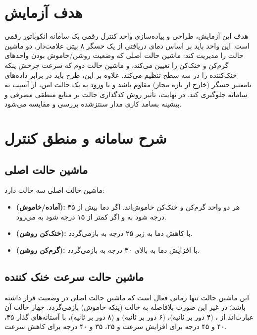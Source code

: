 \documentclass[11pt,a4paper]{article}
\begin{document}
\section{هدف آزمایش}
هدف این آزمایش، طراحی و پیاده‌سازی واحد کنترل رقمی  یک سامانه انکوباتور رقمی  است. این واحد باید بر اساس دمای دریافتی از یک حسگر ۸ بیتی علامت‌دار، دو ماشین حالت را مدیریت کند: ماشین حالت اصلی که وضعیت روشن/خاموش بودن واحدهای گرم‌کن و خنک‌کن را تعیین می‌کند، و ماشین حالت دوم که سرعت چرخش پنکه خنک‌کننده را در سه سطح تنظیم می‌کند. علاوه بر این، طرح باید در برابر داده‌های نامعتبر حسگر (خارج از بازه مجاز) مقاوم باشد و با ورود به یک حالت امن، از آسیب به سامانه جلوگیری کند. در نهایت، تأثیر روش کدگذاری حالت  بر منابع منطقی مصرفی و بیشینه بسامد کاری مدار سنتزشده بررسی و مقایسه می‌شود.

\section{شرح سامانه و منطق کنترل}

\subsection{ماشین حالت اصلی}
ماشین حالت اصلی سه حالت دارد:
\begin{itemize}
    \item \textbf{ (آماده/خاموش):} هر دو واحد گرم‌کن و خنک‌کن خاموش‌اند. اگر دما بیش از ۳۵ درجه شود به  و اگر کمتر از ۱۵ درجه شود به  می‌رود.
    \item \textbf{ (خنک‌کن روشن):} با کاهش دما به زیر ۲۵ درجه به  بازمی‌گردد.
    \item \textbf{ (گرم‌کن روشن):} با افزایش دما به بالای ۳۰ درجه به  بازمی‌گردد.
\end{itemize}

\subsection{ماشین حالت سرعت خنک کننده}
این ماشین حالت تنها زمانی فعال است که ماشین حالت اصلی در وضعیت  قرار داشته باشد؛ در غیر این صورت بلافاصله به حالت  (پنکه خاموش) بازمی‌گردد. چهار حالت آن عبارت‌اند از ،  (۴ دور بر ثانیه)،  (۶ دور بر ثانیه) و  (۸ دور بر ثانیه)، با آستانه‌های گذار ۳۵، ۴۰ و ۴۵ درجه برای افزایش سرعت و ۲۵، ۳۵ و ۴۰ درجه برای کاهش سرعت.
\end{document}

